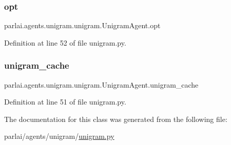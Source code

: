 \subsubsection{\texorpdfstring{opt}{opt}}
{\footnotesize\ttfamily parlai.\+agents.\+unigram.\+unigram.\+Unigram\+Agent.\+opt}



Definition at line 52 of file unigram.\+py.

\mbox{\label{classparlai_1_1agents_1_1unigram_1_1unigram_1_1UnigramAgent_a18103467daa976a54a84feb931cdf2be}} 
\subsubsection{\texorpdfstring{unigram\+\_\+cache}{unigram\_cache}}
{\footnotesize\ttfamily parlai.\+agents.\+unigram.\+unigram.\+Unigram\+Agent.\+unigram\+\_\+cache}



Definition at line 51 of file unigram.\+py.



The documentation for this class was generated from the following file\+:\begin{DoxyCompactItemize}
\item 
parlai/agents/unigram/\hyperlink{unigram_8py}{unigram.\+py}\end{DoxyCompactItemize}
